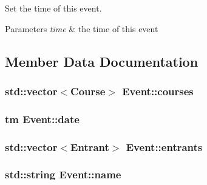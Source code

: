 \-Set the time of this event. 


\begin{DoxyParams}{\-Parameters}
{\em time} & the time of this event \\
\hline
\end{DoxyParams}


\subsection{\-Member \-Data \-Documentation}
\hypertarget{classEvent_a54f5b521beee9f8714ac33e304c948b0}{
\subsubsection[{courses}]{\setlength{\rightskip}{0pt plus 5cm}std\-::vector$<${\bf \-Course}$>$ {\bf \-Event\-::courses}}}\label{classEvent_a54f5b521beee9f8714ac33e304c948b0}
\hypertarget{classEvent_a5df9ecce46e9db33b3b29b99156aa70a}{
\subsubsection[{date}]{\setlength{\rightskip}{0pt plus 5cm}tm {\bf \-Event\-::date}}}\label{classEvent_a5df9ecce46e9db33b3b29b99156aa70a}
\hypertarget{classEvent_adede353249fa65a02148e7fcce077449}{
\subsubsection[{entrants}]{\setlength{\rightskip}{0pt plus 5cm}std\-::vector$<${\bf \-Entrant}$>$ {\bf \-Event\-::entrants}}}\label{classEvent_adede353249fa65a02148e7fcce077449}
\hypertarget{classEvent_ae116bf76fb01a92e000579a5a0d6f35c}{
\subsubsection[{name}]{\setlength{\rightskip}{0pt plus 5cm}std\-::string {\bf \-Event\-::name}}}\label{classEvent_ae116bf76fb01a92e000579a5a0d6f35c}
